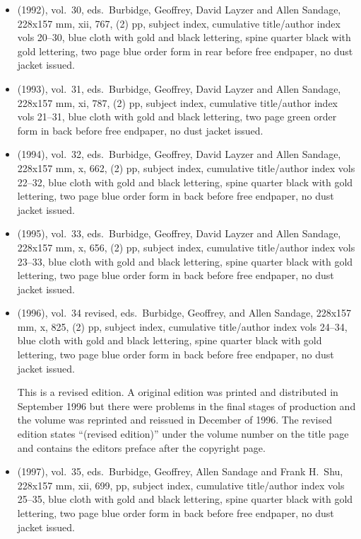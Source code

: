 \begin{itemize}
	\item (1992), vol.\ 30, eds.\ Burbidge, Geoffrey, David Layzer and Allen Sandage, 228x157 mm,
	xii, 767, (2) pp, subject index, cumulative title/author index vols 20--30,
	blue cloth with gold and black lettering, spine quarter black with gold lettering,
	two page blue order form in rear before free endpaper, no dust jacket issued.
	
	\item (1993), vol.\ 31, eds.\ Burbidge, Geoffrey, David Layzer and Allen Sandage, 228x157 mm,
	xi, 787, (2) pp, subject index, cumulative title/author index vols 21--31,
	blue cloth with gold and black lettering,
	two page green order form in back before free endpaper, no dust jacket issued.
	
	\item (1994), vol.\ 32, eds.\ Burbidge, Geoffrey, David Layzer and Allen Sandage, 228x157 mm,
	x, 662, (2) pp, subject index, cumulative title/author index vols 22--32,
	blue cloth with gold and black lettering, spine quarter black with gold lettering,
	two page blue order form in back before free endpaper, no dust jacket	issued.
	
	\item (1995), vol.\ 33, eds.\ Burbidge, Geoffrey, David Layzer and Allen Sandage, 228x157 mm,
	x, 656, (2) pp, subject index, cumulative title/author index vols 23--33,
	blue cloth with gold and black lettering, spine quarter black with gold lettering,
	two page blue order form in back before free endpaper, no dust jacket issued.
	
	\item (1996), vol.\ 34 revised, eds.\ Burbidge, Geoffrey, and Allen Sandage, 228x157 mm,
	x, 825, (2) pp, subject index, cumulative title/author index vols 24--34,
	blue cloth with gold and black lettering, spine quarter black with gold lettering,
	two page blue order form in back before free endpaper, no dust jacket issued.
	
	This is a revised edition.  A original edition was printed and distributed in September 1996
	but there were problems in the final stages of production and the volume was reprinted and
	reissued in December of 1996.  The revised edition states ``(revised edition)'' under the
	volume number on the title page and contains the editors preface after the copyright page.
	
	\item (1997), vol.\ 35, eds.\ Burbidge, Geoffrey, Allen Sandage and Frank H.\ Shu, 228x157 mm,
	xii, 699, pp, subject index, cumulative title/author index vols 25--35,
	blue cloth with gold and black lettering, spine quarter black with gold lettering,
	two page blue order form in back before free endpaper, no dust jacket	issued.
	

\end{itemize}
